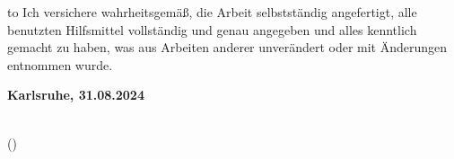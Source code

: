 
\thispagestyle{empty}
\null\vfill
\noindent\hbox to \textwidth{\hrulefill} 
%
{Ich versichere wahrheitsgemäß, die Arbeit
selbstständig angefertigt, alle benutzten Hilfsmittel vollständig und genau
angegeben und alles kenntlich gemacht zu haben, was aus Arbeiten anderer
unverändert oder mit Änderungen entnommen wurde.}
 
 
\textbf{Karlsruhe, 31.08.2024}
\vspace{1.5cm}
 
\dotfill\hspace*{6.0cm}\\
\hspace*{1cm}(\theauthor) 
\cleardoublepage